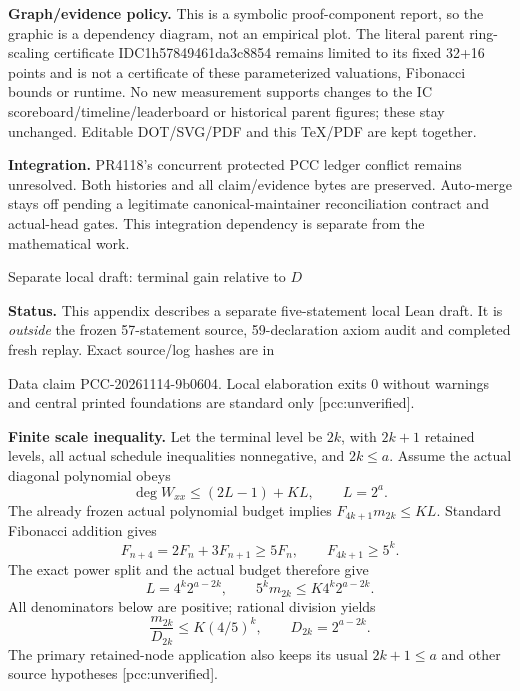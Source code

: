 \documentclass[10pt]{article}
\begin{document}
\textbf{Graph/evidence policy.} This is a symbolic proof-component report,
so the graphic is a dependency diagram, not an empirical plot. The literal
parent ring-scaling certificate IDC1h57849461da3c8854 remains limited to its
fixed 32+16 points and is not a certificate of these parameterized valuations,
Fibonacci bounds or runtime. No new measurement supports changes to the
IC scoreboard/timeline/leaderboard or historical parent figures; these stay
unchanged. Editable DOT/SVG/PDF and this TeX/PDF are kept together.

\textbf{Integration.} PR4118's concurrent protected PCC ledger conflict
remains unresolved. Both histories and all claim/evidence bytes are
preserved. Auto-merge stays off pending a legitimate canonical-maintainer
reconciliation contract and actual-head gates. This integration dependency
is separate from the mathematical work.
\newpage
\begin{center}{\Large Separate local draft: terminal gain relative to $D$}\end{center}
\textbf{Status.} This appendix describes a separate five-statement local
Lean draft. It is \emph{outside} the frozen 57-statement source, 59-declaration
axiom audit and completed fresh replay. Exact source/log hashes are in
\begin{center}\small{}\end{center} Data claim
PCC-20261114-9b0604. Local elaboration exits 0 without warnings and central
printed foundations are standard only [pcc:unverified].

\textbf{Finite scale inequality.} Let the terminal level be $2k$, with
$2k+1$ retained levels, all actual schedule inequalities nonnegative, and
$2k\le a$. Assume the actual diagonal polynomial obeys
\[
 \deg W_{xx}\le (2L-1)+KL,\qquad L=2^a.
\]
The already frozen actual polynomial budget implies
$F_{4k+1}m_{2k}\le KL$. Standard Fibonacci addition gives
\[
 F_{n+4}=2F_n+3F_{n+1}\ge5F_n,
 \qquad F_{4k+1}\ge5^k.
\]
The exact power split and the actual budget therefore give
\[
 L=4^k2^{a-2k},\qquad 5^km_{2k}\le K4^k2^{a-2k}.
\]
All denominators below are positive; rational division yields
\[
 \boxed{\frac{m_{2k}}{D_{2k}}\le K(4/5)^k},\qquad D_{2k}=2^{a-2k}.
\]
The primary retained-node application also keeps its usual $2k+1\le a$
and other source hypotheses [pcc:unverified].
\end{document}

